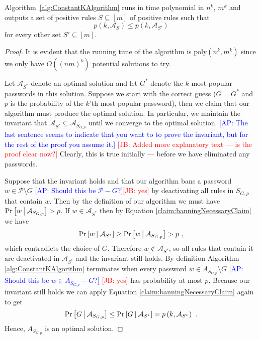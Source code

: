 \documentclass[prodmode,acmec]{ec-acmsmall}
\newcommand{\kibitz}[2]{\ifnum\Comments=1\textcolor{#1}{#2}\fi}
\newcommand{\ap}[1]{\kibitz{blue} {[AP: #1]}}
\newcommand{\jb}[1]{\kibitz{red} {[JB: #1]}}
\newcommand{\PasswordSpace}{\mathcal{P}}
\newcommand{\poly}{\ensuremath{\mathrm{poly}}}
\begin{document}
\begin{theorem} \label{thm:ConstantKAlg}
Algorithm~\ref{alg:ConstantKAlgorithm} runs in time polynomial in $n^k$, $m^k$ and outputs a set of positive rules $S \subseteq [m]$ of positive rules such that \[p\left(k,\mathcal{A}_S \right) \leq p\left(k,\mathcal{A}_{S'} \right)\] for every other set $S' \subseteq [m]$.
\end{theorem}
\begin{proof} 
It is evident that the running time of the algorithm is $\poly(n^k,m^k)$ since we only have $O((nm)^k)$ potential solutions to try.

Let $\mathcal{A}_{S^*}$ denote an optimal solution and let $G^*$ denote the $k$ most popular passwords in this solution. Suppose we start with the correct guess ($G=G^*$ and $p$ is the probability of the $k$'th most popular password), then we claim that our algorithm must produce the optimal solution. In particular, we maintain the invariant that $\mathcal{A}_{S^*} \subseteq \mathcal{A}_{S_{G,p}}$ until we converge to the optimal solution. \ap{The last sentence seems to indicate that you want to to prove the invariant, but for the rest of the proof you assume it.} \jb{Added more explanatory text --- is the proof clear now?} Clearly, this is true initially --- before we have eliminated any passwords.  

Suppose that the invariant holds and that our algorithm bans a password $w \in \PasswordSpace \setminus G$ \ap{Should this be $\PasswordSpace-G$?}\jb{yes} by deactivating all rules in $S_{G,p}$ that contain $w$. Then by the definition of our algorithm we must have  $\Pr\left[w~\vline~\mathcal{A}_{S_{G,p}}\right] > p$. If $w\in\mathcal{A}_{S^*}$ then by Equation \eqref{claim:banningNecessaryClaim} we have \[\Pr\left[w~\vline~\mathcal{A}_{S^*}\right] \geq \Pr\left[w~\vline~\mathcal{A}_{S_{G,p}}\right] > p \ ,\]
which contradicts the choice of $G$. Therefore $w\notin\mathcal{A}_{S^*}$, so all rules that contain it are deactivated in $\mathcal{A}_{S^*}$ and the invariant still holds. By definition Algorithm \ref{alg:ConstantKAlgorithm} terminates when every password $w \in A_{S_{G,p}} \setminus G$ \ap{Should this be $w \in A_{S_{G,p}} -G$?} \jb{yes} has probability at most $p$. Because our invariant still holds we can apply Equation \eqref{claim:banningNecessaryClaim} again to get
\[ \Pr\left[G~\vline~\mathcal{A}_{S_{G,p}} \right]  \leq \Pr\left[G~\vline~\mathcal{A}_{S^*} \right] = p\left(k,\mathcal{A}_{S^*}\right)  \ . \]
Hence, $A_{S_{G,p}}$ is an optimal solution.
\end{proof}
\end{document}
